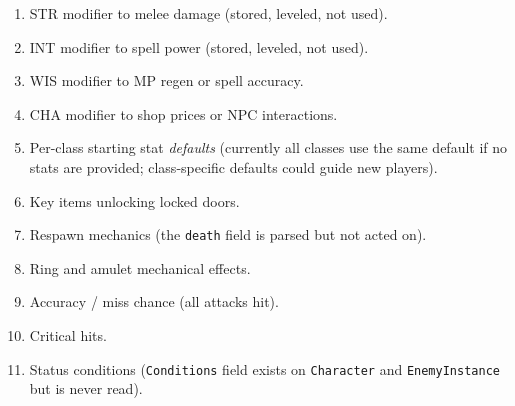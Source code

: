 \documentclass[a4paper,10pt]{article}
\newcommand{\stat}[1]{\textsc{#1}}
\newcommand{\field}[1]{\texttt{#1}}
\begin{document}
\begin{enumerate}[nosep]
  \item \stat{STR} modifier to melee damage (stored, leveled, not used).
  \item \stat{INT} modifier to spell power (stored, leveled, not used).
  \item \stat{WIS} modifier to MP regen or spell accuracy.
  \item \stat{CHA} modifier to shop prices or NPC interactions.
  \item Per-class starting stat \emph{defaults} (currently all classes use
        the same default if no stats are provided; class-specific defaults
        could guide new players).
  \item Key items unlocking locked doors.
  \item Respawn mechanics (the \field{death} field is parsed but not acted on).
  \item Ring and amulet mechanical effects.
  \item Accuracy / miss chance (all attacks hit).
  \item Critical hits.
  \item Status conditions (\field{Conditions} field exists on
        \texttt{Character} and \texttt{EnemyInstance} but is never read).
\end{enumerate}
\end{document}
